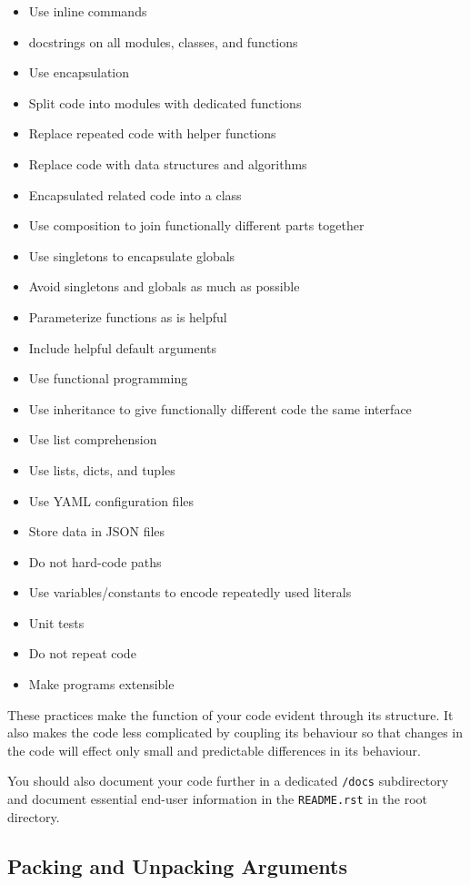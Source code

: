 \documentclass{article}
\begin{document}
\begin{itemize}
\item Use inline commands
\item docstrings on all modules, classes, and functions
\item Use encapsulation
\item Split code into modules with dedicated functions
\item Replace repeated code with helper functions
\item Replace code with data structures and algorithms
\item Encapsulated related code into a class
\item Use composition to join functionally different parts together
\item Use singletons to encapsulate globals
\item Avoid singletons and globals as much as possible
\item Parameterize functions as is helpful
\item Include helpful default arguments
\item Use functional programming
\item Use inheritance to give functionally different code the same interface
\item Use list comprehension
\item Use lists, dicts, and tuples
\item Use YAML configuration files
\item Store data in JSON files
\item Do not hard-code paths
\item Use variables/constants to encode repeatedly used literals
\item Unit tests
\item Do not repeat code
\item Make programs extensible
\end{itemize}

These practices make the function of your code evident 
through its structure.
It also makes the code less complicated by coupling 
its behaviour so that changes in the code
will effect only small and predictable 
differences in its behaviour.

You should also document your code further in a dedicated \texttt{/docs} subdirectory
and document essential end-user information in the \texttt{README.rst} in the root directory.

\subsection{Packing and Unpacking Arguments}
\end{document}
